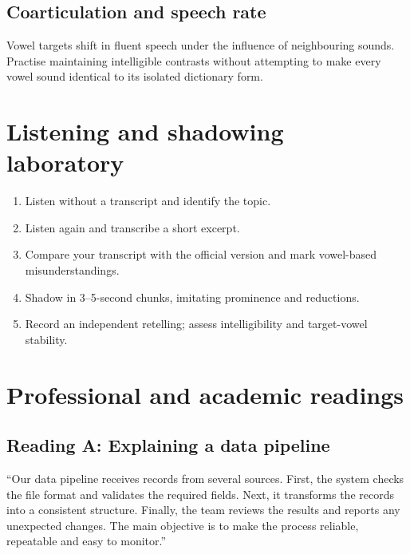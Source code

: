 \subsection{Coarticulation and speech rate}
Vowel targets shift in fluent speech under the influence of neighbouring sounds. Practise maintaining intelligible contrasts without attempting to make every vowel sound identical to its isolated dictionary form.
\section{Listening and shadowing laboratory}
\begin{enumerate}[label=\arabic*.]
\item Listen without a transcript and identify the topic.
\item Listen again and transcribe a short excerpt.
\item Compare your transcript with the official version and mark vowel-based misunderstandings.
\item Shadow in 3--5-second chunks, imitating prominence and reductions.
\item Record an independent retelling; assess intelligibility and target-vowel stability.
\end{enumerate}
\section{Professional and academic readings}
\subsection{Reading A: Explaining a data pipeline}
``Our data pipeline receives records from several sources. First, the system checks the file format and validates the required fields. Next, it transforms the records into a consistent structure. Finally, the team reviews the results and reports any unexpected changes. The main objective is to make the process reliable, repeatable and easy to monitor.''
